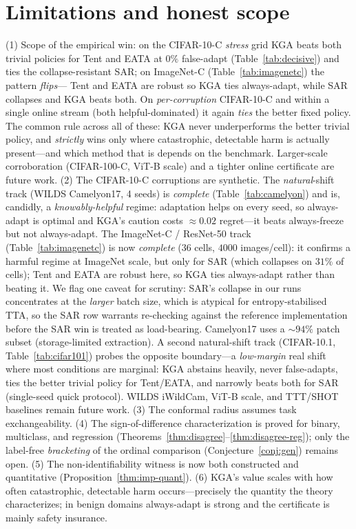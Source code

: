 \documentclass[conference]{IEEEtran}
\theoremstyle{plain}
\theoremstyle{definition}
\begin{document}
\section{Limitations and honest scope}\label{sec:limits}
(1) Scope of the empirical win: on the CIFAR-10-C \emph{stress} grid \textsc{KGA} beats both
trivial policies for Tent and EATA at $0\%$ false-adapt (Table~\ref{tab:decisive}) and ties
the collapse-resistant SAR; on ImageNet-C (Table~\ref{tab:imagenetc}) the pattern \emph{flips}---
Tent and EATA are robust so \textsc{KGA} ties always-adapt, while SAR collapses and \textsc{KGA}
beats both. On \emph{per-corruption} CIFAR-10-C and within a single online stream (both
helpful-dominated) it again \emph{ties} the better fixed policy. The common rule across all of
these: \textsc{KGA} never underperforms the better trivial policy, and \emph{strictly} wins only
where catastrophic, detectable harm is actually present---and which method that is depends on the
benchmark. Larger-scale corroboration (CIFAR-100-C, ViT-B scale) and a tighter online certificate
are future work.
(2) The CIFAR-10-C corruptions are synthetic. The \emph{natural}-shift track
(WILDS Camelyon17, 4 seeds) is \emph{complete} (Table~\ref{tab:camelyon}) and is, candidly, a
\emph{knowably-helpful} regime: adaptation helps on every seed, so always-adapt is optimal and
\textsc{KGA}'s caution costs $\approx\!0.02$ regret---it beats always-freeze but not
always-adapt. The ImageNet-C / ResNet-50 track (Table~\ref{tab:imagenetc}) is now \emph{complete}
($36$ cells, $4000$ images/cell): it confirms a harmful regime at ImageNet scale, but only for
SAR (which collapses on $31\%$ of cells); Tent and EATA are robust here, so \textsc{KGA} ties
always-adapt rather than beating it. We flag one caveat for scrutiny: SAR's collapse in our runs
concentrates at the \emph{larger} batch size, which is atypical for entropy-stabilised TTA, so the
SAR row warrants re-checking against the reference implementation before the SAR win is treated as
load-bearing. Camelyon17 uses a $\sim\!94\%$ patch subset (storage-limited extraction). A second
natural-shift track (CIFAR-10.1, Table~\ref{tab:cifar101}) probes the opposite boundary---a
\emph{low-margin} real shift where most conditions are marginal: \textsc{KGA} abstains heavily,
never false-adapts, ties the better trivial policy for Tent/EATA, and narrowly beats both for SAR
(single-seed quick protocol). WILDS
iWildCam, ViT-B scale, and TTT/SHOT baselines remain future work.
(3) The conformal radius assumes task exchangeability.
(4) The sign-of-difference characterization is proved for binary, multiclass, and
regression (Theorems~\ref{thm:disagree}--\ref{thm:disagree-reg}); only the label-free
\emph{bracketing} of the ordinal comparison (Conjecture~\ref{conj:gen}) remains open.
(5) The non-identifiability witness is now both constructed and quantitative
(Proposition~\ref{thm:imp-quant}).
(6) \textsc{KGA}'s value scales with how often catastrophic, detectable harm
occurs---precisely the quantity the theory characterizes; in benign domains
always-adapt is strong and the certificate is mainly safety insurance.
\end{document}
